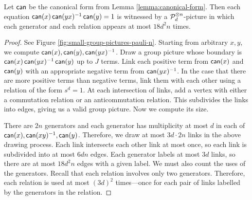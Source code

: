 \begin{lemma}\label{lemma:small-group-pictures-pauli-n}
	Let $\operatorname*{\mathsf{can}}$ be the canonical form from Lemma \ref{lemma:canonical-form}. Then each equation $\operatorname*{\mathsf{can}}(x)\operatorname*{\mathsf{can}}(yx)^{-1}\operatorname*{\mathsf{can}}(y) = 1$ is witnessed by a $\mathcal P_d^{\otimes n}$-picture in which
	each generator and each relation appears at most $18d^2n$ times.
\end{lemma}
\begin{proof}
	See Figure \ref{fig:small-group-pictures-pauli-n}. Starting from arbitrary $x, y$, we compute $\operatorname*{\mathsf{can}}(x), \operatorname*{\mathsf{can}}(y), \operatorname*{\mathsf{can}}(yx)^{-1}$. Draw a group picture whose boundary is $\operatorname*{\mathsf{can}}(x)\operatorname*{\mathsf{can}}(yx)^{-1}\operatorname*{\mathsf{can}}(y)$ up to $J$ terms. Link each positive term from $\operatorname*{\mathsf{can}}(x)$ and $\operatorname*{\mathsf{can}}(y)$ with an appropriate negative term from $\operatorname*{\mathsf{can}}(yx)^{-1}$. In the case that there are more positive terms than negative terms, link them with each other using a relation of the form $s^d=1$. At each intersection of links, add a vertex with either a commutation relation or an anticommutation relation. This subdivides the links into edges, giving us a valid group picture. Now we compute its size.

	There are $2n$ generators and each generator has multiplicity at most $d$ in each of $\operatorname*{\mathsf{can}}(x), \operatorname*{\mathsf{can}}(xy)^{-1}, \operatorname*{\mathsf{can}}(y)$. Therefore, we draw at most $3d\cdot 2n$ links in the above drawing process. Each link intersects each other link at most once, so each link is subdivided into at most $6dn$ edges. Each generator labels at most $3d$ links, so there are at most $18d^2n$ edges with a given label. We must also count the uses of the generators. Recall that each relation involves only two generators. Therefore, each relation is used at most $(3d)^2$ times---once for each pair of links labelled by the generators in the relation.
\end{proof}


